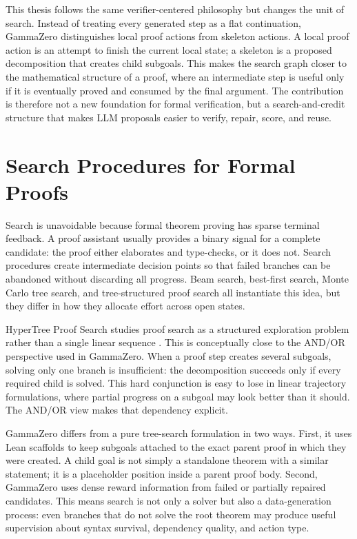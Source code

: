 \documentclass[en]{uet_awesome_thesis/uet-awesome-thesis}
\begin{document}
This thesis follows the same verifier-centered philosophy but changes the unit of search. Instead of
treating every generated step as a flat continuation, GammaZero distinguishes local proof actions
from skeleton actions. A local proof action is an attempt to finish the current local state; a skeleton is a proposed
decomposition that creates child subgoals. This makes the search graph closer to the mathematical
structure of a proof, where an intermediate step is useful only if it is eventually proved and consumed
by the final argument. The contribution is therefore not a new foundation for formal verification, but a
search-and-credit structure that makes LLM proposals easier to verify, repair, score, and reuse.

\section{Search Procedures for Formal Proofs}

Search is unavoidable because formal theorem proving has sparse terminal feedback. A proof assistant
usually provides a binary signal for a complete candidate: the proof either elaborates and type-checks, or
it does not. Search procedures create intermediate decision points so that failed branches can be
abandoned without discarding all progress. Beam search, best-first search, Monte Carlo tree search, and
tree-structured proof search all instantiate this idea, but they differ in how they allocate effort across
open states.

HyperTree Proof Search studies proof search as a structured exploration problem rather than a single
linear sequence \citep{lample2022hypertree}. This is conceptually close to the AND/OR perspective used
in GammaZero. When a proof step creates several subgoals, solving only one branch is insufficient:
the decomposition succeeds only if every required child is solved. This hard conjunction is easy to lose
in linear trajectory formulations, where partial progress on a subgoal may look better than it should.
The AND/OR view makes that dependency explicit.

GammaZero differs from a pure tree-search formulation in two ways. First, it uses Lean scaffolds to keep
subgoals attached to the exact parent proof in which they were created. A child goal is not simply a
standalone theorem with a similar statement; it is a placeholder position inside a parent proof body.
Second, GammaZero uses dense reward information from failed or partially repaired candidates. This
means search is not only a solver but also a data-generation process: even branches that do not solve the
root theorem may produce useful supervision about syntax survival, dependency quality, and action type.
\end{document}
